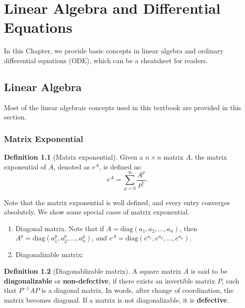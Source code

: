 \documentclass[
]{book}
\theoremstyle{definition}
\newtheorem{definition}{Definition}[chapter]
\theoremstyle{definition}
\theoremstyle{definition}
\theoremstyle{definition}
\theoremstyle{remark}
\begin{document}
\hypertarget{appendix-appendix}{%
\appendix}


\hypertarget{linear-algebra-and-differential-equations}{%
\chapter{Linear Algebra and Differential Equations}\label{linear-algebra-and-differential-equations}}

In this Chapter, we provide basic concepts in linear algebra and ordinary differential equations (ODE), which can be a cheatsheet for readers.

\hypertarget{linear-algebra}{%
\section{Linear Algebra}\label{linear-algebra}}

Most of the linear algebraic concepts used in this textbook are provided in this section.

\hypertarget{matrix-exponential}{%
\subsection{Matrix Exponential}\label{matrix-exponential}}

\begin{definition}[Matrix exponential]
\protect\hypertarget{def:matrixexp}{}\label{def:matrixexp}Given a \(n\times n\) matrix \(A\), the matrix exponential of \(A\), denoted as \(e^A\), is defined as:
\[e^A = \sum_{p=0}^\infty \frac{A^p}{p!}.\]
\end{definition}

Note that the matrix exponential is well defined, and every entry converges absolutely. We show some special cases of matrix exponential.

\begin{enumerate}
\def\labelenumi{\arabic{enumi}.}
\item
  Diagonal matrix. Note that if \(A=\text{diag}(a_1,a_2,\ldots,a_n)\), then \(A^p=\text{diag}(a_1^p,a_2^p,\ldots,a_n^p)\), and \(e^A=\text{diag}(e^{a_1},e^{a_2},\ldots,e^{a_n})\).
\item
  Diagonalizable matrix:
\end{enumerate}

\begin{definition}[Diagonablizable matrix]
\protect\hypertarget{def:diagonaliable}{}\label{def:diagonaliable}A square matrix \(A\) is said to be \textbf{diagonalizable} or \textbf{non-defective}, if there exists an invertible matrix \(P\), such that \(P^{-1}AP\) is a diagonal matrix. In words, after change of coordination, the matrix becomes diagonal. If a matrix is not diagonalizable, it is \textbf{defective}.
\end{definition}
\end{document}
